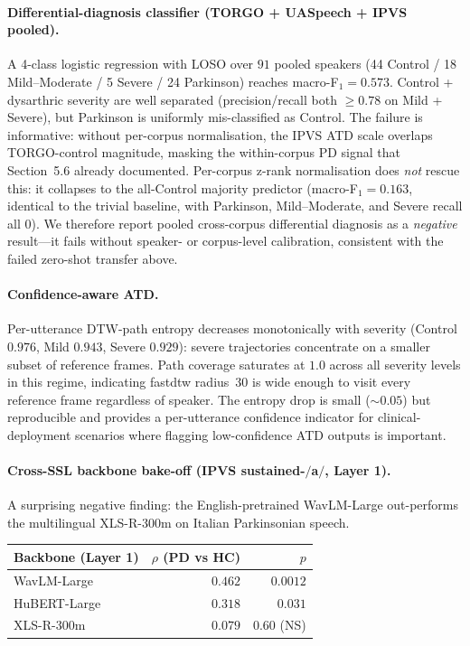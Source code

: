\paragraph{Differential-diagnosis classifier (TORGO + UASpeech + IPVS pooled).}
A 4-class logistic regression with LOSO over $91$ pooled speakers
(44 Control / 18 Mild--Moderate / 5 Severe / 24 Parkinson) reaches
macro-F$_1 = 0.573$. Control + dysarthric severity are well separated
(precision/recall both $\geq 0.78$ on Mild + Severe), but Parkinson
is uniformly mis-classified as Control. The failure is informative:
without per-corpus normalisation, the IPVS ATD scale overlaps
TORGO-control magnitude, masking the within-corpus PD signal that
Section~5.6 already documented. Per-corpus z-rank normalisation does
\emph{not} rescue this: it collapses to the all-Control majority
predictor (macro-F$_1 = 0.163$, identical to the trivial baseline,
with Parkinson, Mild--Moderate, and Severe recall all $0$). We
therefore report pooled cross-corpus differential diagnosis as a
\emph{negative} result---it fails without speaker- or corpus-level
calibration, consistent with the failed zero-shot transfer above.

\paragraph{Confidence-aware ATD.}
Per-utterance DTW-path entropy decreases monotonically with severity
(Control $0.976$, Mild $0.943$, Severe $0.929$): severe trajectories
concentrate on a smaller subset of reference frames. Path coverage
saturates at $1.0$ across all severity levels in this regime,
indicating fastdtw radius~$30$ is wide enough to visit every
reference frame regardless of speaker. The entropy drop is small
($\sim 0.05$) but reproducible and provides a per-utterance
confidence indicator for clinical-deployment scenarios where flagging
low-confidence ATD outputs is important.

\paragraph{Cross-SSL backbone bake-off (IPVS sustained-$/$a$/$, Layer 1).}
A surprising negative finding: the English-pretrained WavLM-Large
out-performs the multilingual XLS-R-300m on Italian Parkinsonian
speech.

\begin{tabular}{lrr}
\toprule
Backbone (Layer 1) & $\rho$ (PD vs HC) & $p$ \\
\midrule
WavLM-Large       & $\mathbf{0.462}$ & $0.0012$ \\
HuBERT-Large      & $0.318$          & $0.031$ \\
XLS-R-300m        & $0.079$          & $0.60$ (NS) \\
\bottomrule
\end{tabular}

